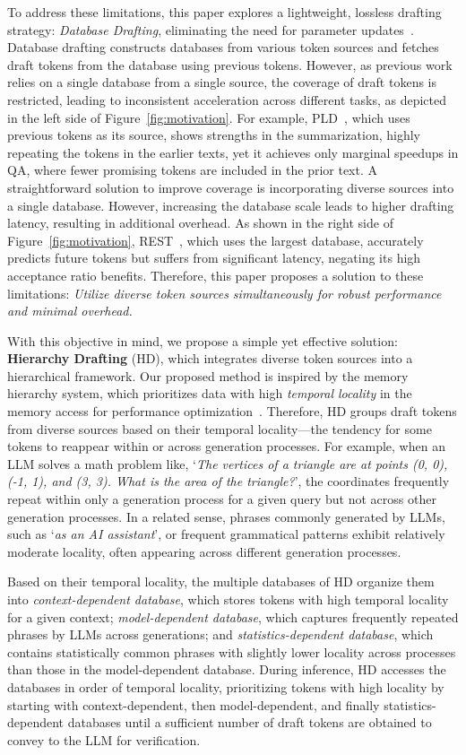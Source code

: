 To address these limitations, this paper explores a lightweight, lossless drafting strategy: \textit{Database Drafting}, eliminating the need for parameter updates~\cite{PLD, LAD, REST}. 
Database drafting constructs databases from various token sources and fetches draft tokens from the database using previous tokens.
However, as previous work relies on a single database from a single source, the coverage of draft tokens is restricted, leading to inconsistent acceleration across different tasks, as depicted in the left side of Figure~\ref{fig:motivation}. 
For example, PLD~\cite{PLD}, which uses previous tokens as its source, shows strengths in the summarization, highly repeating the tokens in the earlier texts, yet it achieves only marginal speedups in QA, where fewer promising tokens are included in the prior text. 
A straightforward solution to improve coverage is incorporating diverse sources into a single database. 
However, increasing the database scale leads to higher drafting latency, resulting in additional overhead.
As shown in the right side of Figure~\ref{fig:motivation}, REST~\cite{REST}, which uses the largest database, accurately predicts future tokens but suffers from significant latency, negating its high acceptance ratio benefits. 
Therefore, this paper proposes a solution to these limitations: \textit{Utilize diverse token sources simultaneously for robust performance and minimal overhead.}


With this objective in mind, we propose a simple yet effective solution: \textbf{Hierarchy Drafting} (HD), which integrates diverse token sources into a hierarchical framework. 
Our proposed method is inspired by the memory hierarchy system, which prioritizes data with high \textit{temporal locality} in the memory access for performance optimization~\cite{hierarchy}.
Therefore, HD groups draft tokens from diverse sources based on their temporal locality---the tendency for some tokens to reappear within or across generation processes. 
For example, when an LLM solves a math problem like, ‘\textit{The vertices of a triangle are at points (0, 0), (-1, 1), and (3, 3). What is the area of the triangle?}’, the coordinates frequently repeat within only a generation process for a given query but not across other generation processes.
In a related sense, phrases commonly generated by LLMs, such as ‘\textit{as an AI assistant}’, or frequent grammatical patterns exhibit relatively moderate locality, often appearing across different generation processes. 

Based on their temporal locality, the multiple databases of HD organize them into \textit{context-dependent database}, which stores tokens with high temporal locality for a given context; \textit{model-dependent database}, which captures frequently repeated phrases by LLMs across generations; and \textit{statistics-dependent database}, which contains statistically common phrases with slightly lower locality across processes than those in the model-dependent database.
During inference, HD accesses the databases in order of temporal locality, prioritizing tokens with high locality by starting with context-dependent, then model-dependent, and finally statistics-dependent databases until a sufficient number of draft tokens are obtained to convey to the LLM for verification.



